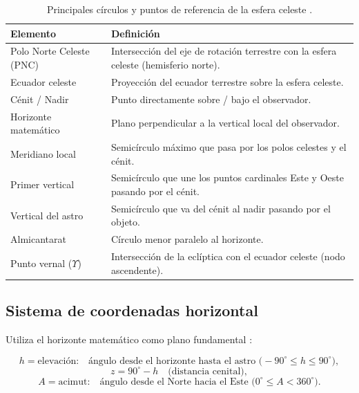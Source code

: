 \begin{table}[H]
  \centering
  \caption{Principales círculos y puntos de referencia de la esfera celeste
           \citep{PortillaBarbosa2009,Karttunen2007}.}
  \label{tab:circulos}
  \begin{tabular}{p{4.2cm} p{9.5cm}}
    \toprule
    \textbf{Elemento} & \textbf{Definición} \\
    \midrule
    Polo Norte Celeste (PNC) & Intersección del eje de rotación terrestre con la esfera celeste (hemisferio norte). \\
    Ecuador celeste & Proyección del ecuador terrestre sobre la esfera celeste. \\
    Cénit / Nadir & Punto directamente sobre / bajo el observador. \\
    Horizonte matemático & Plano perpendicular a la vertical local del observador. \\
    Meridiano local & Semicírculo máximo que pasa por los polos celestes y el cénit. \\
    Primer vertical & Semicírculo que une los puntos cardinales Este y Oeste pasando por el cénit. \\
    Vertical del astro & Semicírculo que va del cénit al nadir pasando por el objeto. \\
    Almicantarat & Círculo menor paralelo al horizonte. \\
    Punto vernal ($\Upsilon$) & Intersección de la eclíptica con el ecuador celeste (nodo ascendente). \\
    \bottomrule
  \end{tabular}
\end{table}

\subsection{Sistema de coordenadas horizontal}

Utiliza el horizonte matemático como plano fundamental \citep{PortillaBarbosa2009}:

\begin{equation}
  h = \text{elevación:} \quad \text{ángulo desde el horizonte hasta el astro (}
  -90^\circ \leq h \leq 90^\circ\text{)},
\end{equation}
\begin{equation}
  z = 90^\circ - h \quad \text{(distancia cenital)},
  \label{eq:cenital}
\end{equation}
\begin{equation}
  A = \text{acimut:} \quad \text{ángulo desde el Norte hacia el Este (}
  0^\circ \leq A < 360^\circ\text{)}.
\end{equation}

